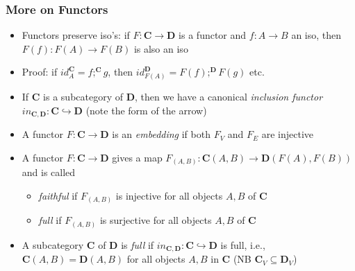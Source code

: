 \documentclass[handout]{beamer}
\newcommand{\bfsf}[1]{{\boldsymbol{#1}}}
\newcommand{\CC}{\bfsf{C}}
\newcommand{\DD}{\bfsf{D}}
\begin{document}
\frame
  {   
    \frametitle{More on Functors}\label{Ch2:MoreOnFunctors}

 \begin{itemize}[<+->]
\item Functors preserve iso's: if $F: \CC\to\DD$ is a functor and
$f:A\to B$ an iso, then $F(f): F(A)\to F(B)$ is also an iso
\item Proof: if $id^\CC_A = f;^\CC g$, then $id^\DD_{F(A)} = F(f) ;^\DD F(g)$ etc.
\item If $\CC$ is a subcategory of $\DD$, then we have a canonical 
\emph{inclusion functor} $in_{\CC,\DD}:\CC\hookrightarrow\DD$ (note the form of the arrow)
\item A functor $F: \CC\to\DD$ is an \emph{embedding} if both $F_V$ and $F_E$ are
injective
\item A functor $F: \CC\to\DD$ gives a map $F_{(A,B)}: \CC(A,B)\to\DD(F(A),F(B))$
and is called
   \begin{itemize}[<+->]
\item \emph{faithful} if  $F_{(A,B)}$ is injective for all objects $A,B$ of $\CC$
\item \emph{full} if  $F_{(A,B)}$ is surjective for all objects $A,B$ of $\CC$
   \end{itemize}
\item A subcategory $\CC$ of $\DD$ is \emph{full} 
if $in_{\CC,\DD}: \CC\hookrightarrow\DD$ is full, i.e., $\CC(A,B) = \DD(A,B)$ 
for all objects $A,B$ in $\CC$ (NB $\CC_ V \subseteq \DD_V$)
 \end{itemize}

 }
\end{document}

